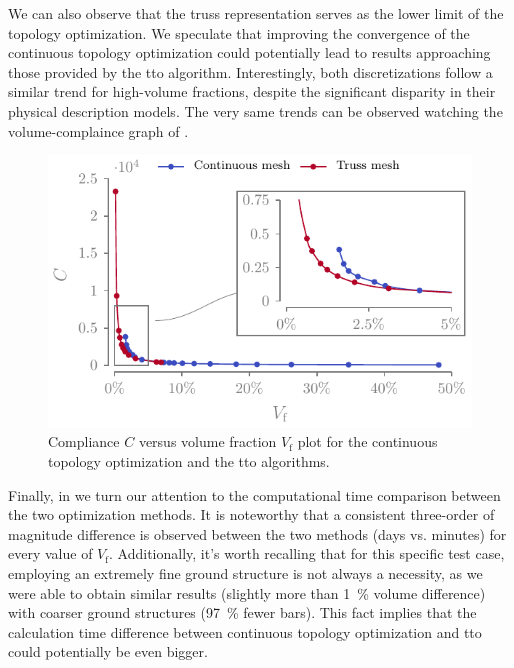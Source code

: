 We can also observe that the truss representation serves as the lower limit of the topology optimization. We speculate that improving the convergence of the continuous topology optimization could potentially lead to results approaching those provided by the \gls{tto} algorithm. Interestingly, both discretizations follow a similar trend for high-volume fractions, despite the significant disparity in their physical description models. The very same trends can be observed watching the volume-complaince graph of .
\begin{figure}
    \centering
    \includegraphics{figures/03_comparison_TO_TTO/16_comp_vol/comp_vol.pdf}
    \caption{Compliance $C$ versus volume fraction $V_\text{f}$ plot for the continuous topology optimization and the \gls{tto} algorithms.}
    \label{fig:03_comp_vol}
\end{figure}

Finally, in  we turn our attention to the computational time comparison between the two optimization methods. It is noteworthy that a consistent three-order of magnitude difference is observed between the two methods (days vs. minutes) for every value of $V_\text{f}$. Additionally, it's worth recalling that for this specific test case, employing an extremely fine ground structure is not always a necessity, as we were able to obtain similar results (slightly more than \qty{1}{\percent} volume difference) with coarser ground structures (\qty{97}{\percent} fewer bars). This fact implies that the calculation time difference between continuous topology optimization and \gls{tto} could potentially be even bigger.


